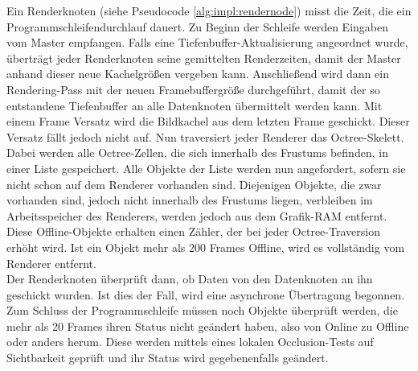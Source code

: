 Ein Renderknoten (siehe Pseudocode \ref{alg:impl:rendernode}) misst die Zeit, die ein Programmschleifendurchlauf dauert. Zu Beginn der Schleife werden Eingaben vom Master empfangen. Falls eine Tiefenbuffer-Aktualisierung angeordnet wurde, überträgt jeder Renderknoten seine gemittelten Renderzeiten, damit der Master anhand dieser neue Kachelgrößen vergeben kann. Anschließend wird dann ein Rendering-Pass mit der neuen Framebuffergröße durchgeführt, damit der so entstandene Tiefenbuffer an alle Datenknoten übermittelt werden kann. Mit einem Frame Versatz wird die Bildkachel aus dem letzten Frame geschickt. Dieser Versatz fällt jedoch nicht auf. Nun traversiert jeder Renderer das Octree-Skelett. Dabei werden alle Octree-Zellen, die sich innerhalb des Frustums befinden, in einer Liste gespeichert. Alle Objekte der Liste werden nun angefordert, sofern sie nicht schon auf dem Renderer vorhanden sind. Diejenigen Objekte, die zwar vorhanden sind, jedoch nicht innerhalb des Frustums liegen, verbleiben im Arbeitsspeicher des Renderers, werden jedoch aus dem Grafik-RAM entfernt. Diese Offline-Objekte erhalten einen Zähler, der bei jeder Octree-Traversion erhöht wird. Ist ein Objekt mehr als 200 Frames Offline, wird es vollständig vom Renderer entfernt.\\
Der Renderknoten überprüft dann, ob Daten von den Datenknoten an ihn geschickt wurden. Ist dies der Fall, wird eine asynchrone Übertragung begonnen. Zum Schluss der Programmschleife müssen noch Objekte überprüft werden, die mehr als 20 Frames ihren Status nicht geändert haben, also von Online zu Offline oder anders herum. Diese werden mittels eines lokalen Occlusion-Tests auf Sichtbarkeit geprüft und ihr Status wird gegebenenfalls geändert.
 
